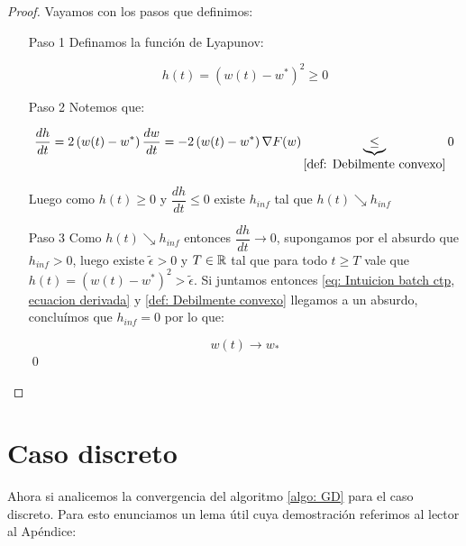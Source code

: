 \begin{proof} Vayamos con los pasos que definimos:
	
	
	\begin{enumerate}
		
		
		\item[Paso 1] Definamos la funci\'on de Lyapunov:
		
		\begin{equation*}
			h(t) = \left(w(t) - w^*\right)^2 \geq 0
		\end{equation*}
		
		\item[Paso 2] Notemos que:
		
		\begin{equation}
		\label{eq: Intuicion batch ctp, ecuacion derivada}
			\dfrac{dh}{dt} = 2 \left(w(t) - w^*\right) \dfrac{dw}{dt} = -2 \left(w(t) - w^*\right) \nabla F(w) \underbrace{\leq}_{\ref{def: Debilmente convexo}} 0
		\end{equation}
		
		Luego como $h(t) \geq 0$ y $\dfrac{dh}{dt} \leq 0$ existe $h_{inf}$ tal que $h(t) \searrow h_{inf}$
		
		\item[Paso 3] Como $h(t) \searrow h_{inf}$ entonces $\dfrac{dh}{dt} \rightarrow 0$, supongamos por el absurdo que $h_{inf} > 0$, luego existe $\widetilde{\epsilon} >0$ y $T \in {\mathbb{R}}$ tal que para todo $t \geq T$ vale que $h(t) = \left(w(t) - w^*\right)^2 > \widetilde{\epsilon}$. Si juntamos entonces \ref{eq: Intuicion batch ctp, ecuacion derivada} y \ref{def: Debilmente convexo} llegamos a un absurdo, conclu\'imos que $h_{inf} = 0$ por lo que:
		
		\begin{equation*}
			w(t) \rightarrow w_*
		\end{equation*}
		\qed
	\end{enumerate}
\end{proof}

\section{Caso discreto}

Ahora si analicemos la convergencia del algoritmo \ref{algo: GD} para el caso discreto. Para esto enunciamos un lema \'util cuya demostraci\'on referimos al lector al Ap\'endice:

